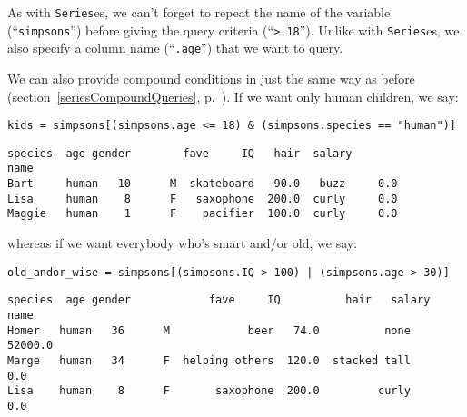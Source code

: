 As with \texttt{Series}es, we can't forget to repeat the name of the variable
(``\texttt{simpsons}'') before giving the query criteria (``\texttt{> 18}'').
Unlike with \texttt{Series}es, we also specify a column name
(``\texttt{.age}'') that we want to query.


We can also provide compound conditions in just the same way as before
(section~\ref{seriesCompoundQueries}, p.~\pageref{seriesCompoundQueries}). If
we want only human children, we say:

\begin{Verbatim}[fontsize=\small,samepage=true,frame=single,framesep=3mm]
kids = simpsons[(simpsons.age <= 18) & (simpsons.species == "human")]
\end{Verbatim}
\vspace{-.2in}

\begin{Verbatim}[fontsize=\small,samepage=true,frame=leftline,framesep=5mm,framerule=1mm]
       species  age gender        fave     IQ   hair  salary
name                                                        
Bart     human   10      M  skateboard   90.0   buzz     0.0
Lisa     human    8      F   saxophone  200.0  curly     0.0
Maggie   human    1      F    pacifier  100.0  curly     0.0
\end{Verbatim}

whereas if we want everybody who's smart and/or old, we say:

\begin{Verbatim}[fontsize=\small,samepage=true,frame=single,framesep=3mm]
old_andor_wise = simpsons[(simpsons.IQ > 100) | (simpsons.age > 30)]
\end{Verbatim}
\vspace{-.2in}

\begin{Verbatim}[fontsize=\small,samepage=true,frame=leftline,framesep=5mm,framerule=1mm]
      species  age gender            fave     IQ          hair   salary
name                                                                   
Homer   human   36      M            beer   74.0          none  52000.0
Marge   human   34      F  helping others  120.0  stacked tall      0.0
Lisa    human    8      F       saxophone  200.0         curly      0.0
\end{Verbatim}

